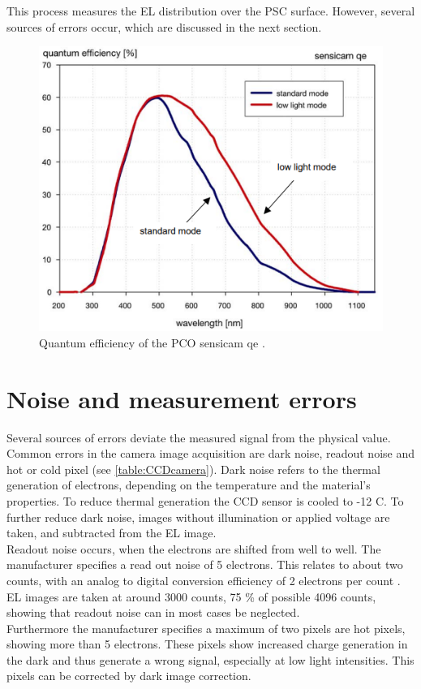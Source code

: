 This process measures the EL distribution over the PSC surface. However, several sources of errors occur, which are discussed in the next section.
\begin{figure}[h]
	\centering
	\includegraphics[width=0.7\linewidth]{Images/ExperimentalSetup/PCO_sensicam_QE}
	\caption{Quantum efficiency of the PCO sensicam qe \cite{ManualSensicam}.}
	\label{fig:pcosensicamqe}
\end{figure}
\FloatBarrier
\section{Noise and measurement errors}
Several sources of errors deviate the measured signal from the physical value. Common errors in the camera image acquisition are dark noise, readout noise and hot or cold pixel (see \autoref{table:CCDcamera}). Dark noise refers to the thermal generation of electrons, depending on the temperature and the material's properties. To reduce thermal generation the CCD sensor is cooled to -12 \textdegree C. To further reduce dark noise, images without illumination or applied voltage are taken, and subtracted from the EL image.\\
Readout noise occurs, when the electrons are shifted from well to well. The manufacturer specifies a read out noise of 5 electrons. This relates to about two counts, with an analog to digital conversion efficiency of 2 electrons per count \cite{ManualSensicam}. EL images are taken at around 3000 counts, 75 \% of possible 4096 counts, showing that readout noise can in most cases be neglected. \\
Furthermore the manufacturer specifies a maximum of two pixels are hot pixels, showing more than 5 electrons. These pixels show increased charge generation in the dark and thus generate a wrong signal, especially at low light intensities. This pixels can be corrected by dark image correction.  %

